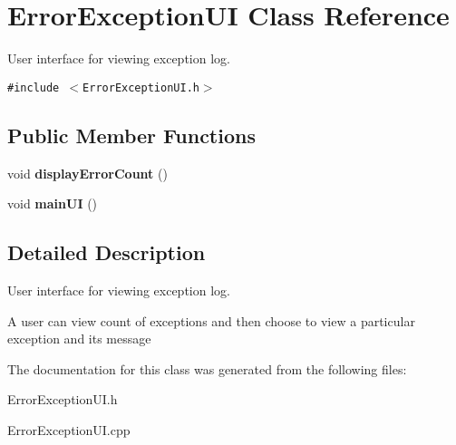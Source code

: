 \hypertarget{class_error_exception_u_i}{
\section{Error\-Exception\-UI Class Reference}
\label{class_error_exception_u_i}
}
User interface for viewing exception log.  


{\tt \#include $<$Error\-Exception\-UI.h$>$}

\subsection*{Public Member Functions}
\begin{CompactItemize}
\item 
\hypertarget{class_error_exception_u_i_c220b0cf73dd91d6e72ec18ed4817496}{
void {\bf display\-Error\-Count} ()}
\label{class_error_exception_u_i_c220b0cf73dd91d6e72ec18ed4817496}

\item 
\hypertarget{class_error_exception_u_i_3c76ebf8f201727c96b59855cb91ddf1}{
void {\bf main\-UI} ()}
\label{class_error_exception_u_i_3c76ebf8f201727c96b59855cb91ddf1}

\end{CompactItemize}


\subsection{Detailed Description}
User interface for viewing exception log. 

A user can view count of exceptions and then choose to view a particular exception and its message 



The documentation for this class was generated from the following files:\begin{CompactItemize}
\item 
Error\-Exception\-UI.h\item 
Error\-Exception\-UI.cpp\end{CompactItemize}
